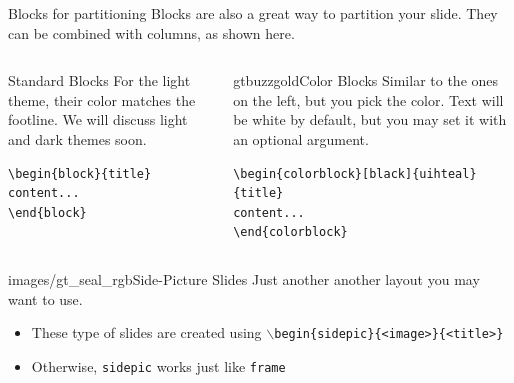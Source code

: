 \documentclass{beamer}
\begin{document}
\begin{frame}[fragile]{Blocks for partitioning}
Blocks are also a great way to partition your slide. They can be combined with columns, as shown here.
\begin{columns}
\begin{column}{0.3\textwidth}
\begin{block}{Standard Blocks}
For the light theme, their color matches the footline. We will discuss light and dark themes soon.
\begin{verbatim}
\begin{block}{title}
content...
\end{block}
\end{verbatim}
\end{block}
\end{column}
\begin{column}{0.7\textwidth}
\begin{colorblock}[black]{gtbuzzgold}{Color Blocks}
Similar to the ones on the left, but you pick the color. Text will be white by 
default, but you may set it with an optional argument.
\small
\begin{verbatim}
\begin{colorblock}[black]{uihteal}{title}
content...
\end{colorblock}
\end{verbatim}
\end{colorblock}
\end{column}
\end{columns}
\end{frame}


\begin{sidepic}{images/gt_seal_rgb}{Side-Picture Slides}
Just another another layout you may want to use.
\begin{itemize}
\item These type of slides are created using \texttt{$\backslash$begin\{sidepic\}\{<image>\}\{<title>\}}
\item Otherwise, \texttt{sidepic} works just like \texttt{frame}
\end{itemize}
\end{sidepic}


\renewcommand{\algorithmicrequire}{\textbf{Input:}}
\renewcommand{\algorithmicensure}{\textbf{Output:}}
\newcommand*\CALL[2]{\textsc{#1}(#2)}
\newcommand*\ANNOTATE[1]{\hfill\(\triangleright\) #1}%

\footlinecolor{}
\end{document}
